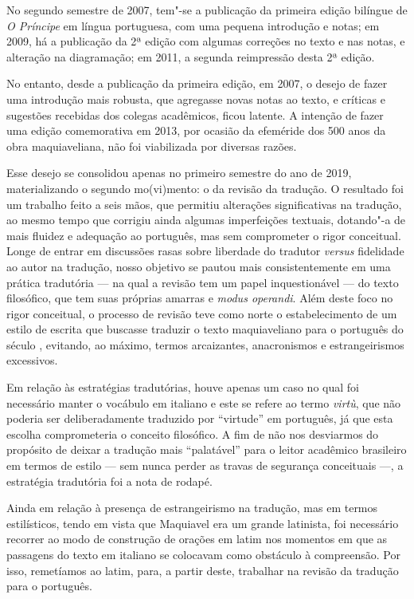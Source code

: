 No segundo semestre de 2007, tem"-se a publicação da primeira edição
bilíngue de \emph{O Príncipe} em língua portuguesa, com uma pequena
introdução e notas; em 2009, há a publicação da 2ª edição com algumas
correções no texto e nas notas, e alteração na diagramação; em 2011, a
segunda reimpressão desta 2ª edição.

No entanto, desde a publicação da primeira edição, em 2007, o desejo de
fazer uma introdução mais robusta, que agregasse novas notas ao texto, e
críticas e sugestões recebidas dos colegas acadêmicos, ficou latente. A
intenção de fazer uma edição comemorativa em 2013, por ocasião da
efeméride dos 500 anos da obra maquiaveliana, não foi viabilizada por
diversas razões.

Esse desejo se consolidou apenas no primeiro semestre do ano de 2019,
materializando o segundo mo(vi)mento: o da revisão da tradução. O
resultado foi um trabalho feito a seis mãos, que permitiu alterações
significativas na tradução, ao mesmo tempo que corrigiu ainda algumas
imperfeições textuais, dotando"-a de mais fluidez e adequação ao
português, mas sem comprometer o rigor conceitual. Longe de entrar em
discussões rasas sobre liberdade do tradutor \emph{versus} fidelidade ao
autor na tradução, nosso objetivo se pautou mais consistentemente em uma
prática tradutória --- na qual a revisão tem um papel inquestionável ---
do texto filosófico, que tem suas próprias amarras e \emph{modus
operandi}. Além deste foco no rigor conceitual, o processo de revisão
teve como norte o estabelecimento de um estilo de escrita que buscasse
traduzir o texto maquiaveliano para o português do século , evitando,
ao máximo, termos arcaizantes, anacronismos e estrangeirismos
excessivos.

Em relação às estratégias tradutórias, houve apenas um caso no qual foi
necessário manter o vocábulo em italiano e este se refere ao termo
\emph{virtù}, que não poderia ser deliberadamente traduzido por
``virtude'' em português, já que esta escolha comprometeria o conceito
filosófico. A fim de não nos desviarmos do propósito de deixar a
tradução mais ``palatável'' para o leitor acadêmico brasileiro em termos
de estilo --- sem nunca perder as travas de segurança conceituais ---, a
estratégia tradutória foi a nota de rodapé.

Ainda em relação à presença de estrangeirismo na tradução, mas em termos
estilísticos, tendo em vista que Maquiavel era um grande latinista, foi
necessário recorrer ao modo de construção de orações em latim nos
momentos em que as passagens do texto em italiano se colocavam como
obstáculo à compreensão. Por isso, remetíamos ao latim, para, a partir
deste, trabalhar na revisão da tradução para o português.

